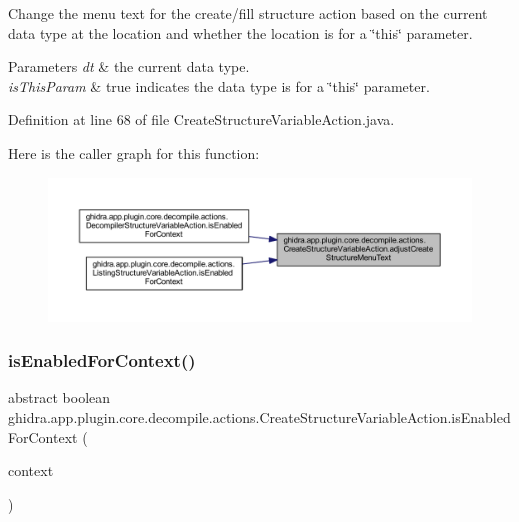 Change the menu text for the create/fill structure action based on the current data type at the location and whether the location is for a \char`\"{}this\char`\"{} parameter. 
\begin{DoxyParams}{Parameters}
{\em dt} & the current data type. \\
\hline
{\em is\+This\+Param} & true indicates the data type is for a \char`\"{}this\char`\"{} parameter. \\
\hline
\end{DoxyParams}


Definition at line 68 of file Create\+Structure\+Variable\+Action.\+java.

Here is the caller graph for this function\+:
\nopagebreak
\begin{figure}[H]
\begin{center}
\leavevmode
\includegraphics[width=350pt]{classghidra_1_1app_1_1plugin_1_1core_1_1decompile_1_1actions_1_1_create_structure_variable_action_ad5aad5b060b0994438c70aca92573b19_icgraph}
\end{center}
\end{figure}
\mbox{\label{classghidra_1_1app_1_1plugin_1_1core_1_1decompile_1_1actions_1_1_create_structure_variable_action_ac9ec273aa2ced519b1cb48f8ab003c18}} 
\subsubsection{\texorpdfstring{isEnabledForContext()}{isEnabledForContext()}}
{\footnotesize\ttfamily abstract boolean ghidra.\+app.\+plugin.\+core.\+decompile.\+actions.\+Create\+Structure\+Variable\+Action.\+is\+Enabled\+For\+Context (\begin{DoxyParamCaption}\item[{Action\+Context}]{context }\end{DoxyParamCaption})\hspace{0.3cm}{\ttfamily [abstract]}}



